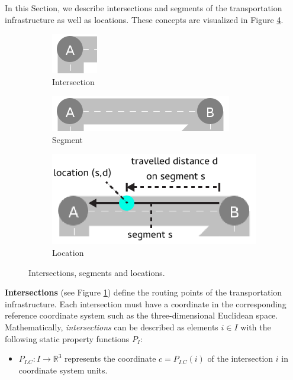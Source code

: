\documentclass[graybox]{svmult}
\begin{document}
In this Section, we describe intersections and segments of the transportation infrastructure as well as locations. These concepts are visualized in Figure \ref{fig:intersections-segments}.

\begin{figure}[htbp]
	\centering
	\begin{subfigure}{.2\textwidth}
		\centering
		\includegraphics[scale=0.4]{../../concepts/intersection.png}
		\caption{Intersection}
		\label{fig:intersection}
	\end{subfigure}
	\begin{subfigure}{.35\textwidth}
		\centering
		\includegraphics[scale=0.4]{../../concepts/segment.png}
		\caption{Segment}
		\label{fig:segment}
	\end{subfigure}
	\begin{subfigure}{.35\textwidth}
		\centering
		\includegraphics[scale=0.4]{../../concepts/location.png}
		\caption{Location}
		\label{fig:location}
	\end{subfigure}
	\caption{Intersections, segments and locations.}
	\label{fig:intersections-segments}	
\end{figure}

\noindent \textbf{Intersections} (see Figure \ref{fig:intersection}) define the routing points of the transportation infrastructure.
Each intersection must have a coordinate in the corresponding reference coordinate system such as the three-dimensional Euclidean space.
Mathematically, \textit{intersections} can be described as elements $i \in I$ with the following static property functions $P_{I}$:
\begin{itemize}
	\item $P_{I.C}: I \rightarrow \mathbb{R}^3$ represents the coordinate $c = P_{I.C}(i)$ of the intersection $i$ in coordinate system units.
\end{itemize}
\end{document}
